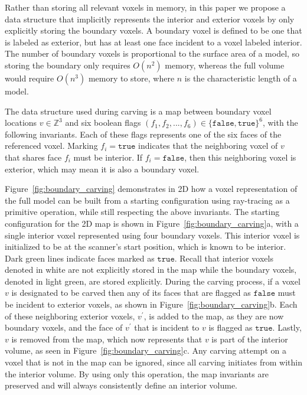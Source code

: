 \documentclass[10pt,twocolumn,letterpaper]{article}
\begin{document}
Rather than storing all relevant voxels in memory, in this paper we propose a data structure that implicitly represents the interior and exterior voxels by only explicitly storing the boundary voxels.  A boundary voxel is defined to be one that is labeled as exterior, but has at least one face incident to a voxel labeled interior.  The number of boundary voxels is proportional to the surface area of a model, so storing the boundary only requires $O(n^2)$ memory, whereas the full volume would require $O(n^3)$ memory to store, where $n$ is the characteristic length of a model.

The data structure used during carving is a map between boundary voxel locations $v \in \mathbb{Z}^3$ and six boolean flags $(f_1,f_2,...,f_6) \in \{\texttt{false},\texttt{true}\}^6$, with the following invariants.  Each of these flags represents one of the six faces of the referenced voxel.  Marking $f_i = \texttt{true}$ indicates that the neighboring voxel of $v$ that shares face $f_i$ must be interior.  If $f_i = \texttt{false}$, then this neighboring voxel is exterior, which may mean it is also a boundary voxel.

Figure~\ref{fig:boundary_carving} demonstrates in 2D how a voxel representation of the full model can be built from a starting configuration using ray-tracing as a primitive operation, while still respecting the above invariants.  The starting configuration for the 2D map is shown in Figure~\ref{fig:boundary_carving}a, with a single interior voxel represented using four boundary voxels.  This interior voxel is initialized to be at the scanner's start position, which is known to be interior.  Dark green lines indicate faces marked as $\texttt{true}$.  Recall that interior voxels denoted in white are not explicitly stored in the map while the boundary voxels, denoted in light green, are stored explicitly.  During the carving process, if a voxel $v$ is designated to be carved then any of its faces that are flagged as $\texttt{false}$ must be incident to exterior voxels, as shown in Figure~\ref{fig:boundary_carving}b.  Each of these neighboring exterior voxels, $v^{\prime}$, is added to the map, as they are now boundary voxels, and the face of $v^{\prime}$ that is incident to $v$ is flagged as $\texttt{true}$.  Lastly, $v$ is removed from the map, which now represents that $v$ is part of the interior volume, as seen in Figure~\ref{fig:boundary_carving}c.  Any carving attempt on a voxel that is not in the map can be ignored, since all carving initiates from within the interior volume.  By using only this operation, the map invariants are preserved and will always consistently define an interior volume.
\end{document}
